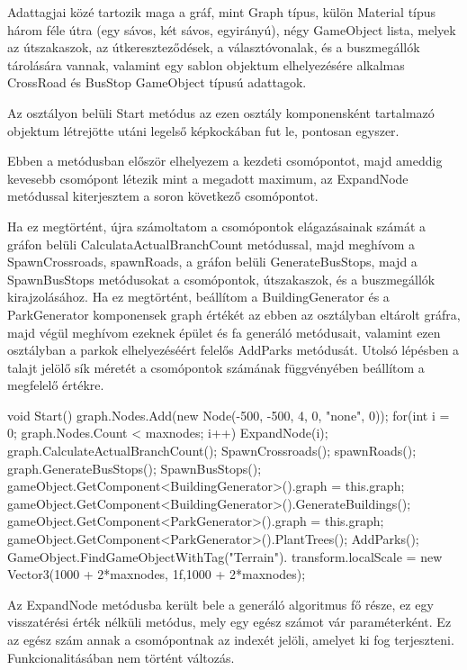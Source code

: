 Adattagjai közé tartozik maga a gráf, mint Graph típus, külön Material típus három féle útra (egy sávos, két sávos, egyirányú), négy GameObject lista, melyek az útszakaszok, az útkereszteződések, a választóvonalak, és a buszmegállók tárolására vannak, valamint egy sablon objektum elhelyezésére alkalmas CrossRoad és BusStop GameObject típusú adattagok.

Az osztályon belüli Start metódus az ezen osztály komponensként tartalmazó objektum létrejötte utáni legelső képkockában fut le, pontosan egyszer.

Ebben a metódusban először elhelyezem a kezdeti csomópontot, majd ameddig kevesebb csomópont létezik mint a megadott maximum, az ExpandNode metódussal kiterjesztem a soron következő csomópontot.

Ha ez megtörtént, újra számoltatom a csomópontok elágazásainak számát a gráfon belüli CalculataActualBranchCount metódussal, majd meghívom a SpawnCrossroads, spawnRoads, a gráfon belüli GenerateBusStops, majd a SpawnBusStops metódusokat a csomópontok, útszakaszok, és a buszmegállók kirajzolásához. Ha ez megtörtént, beállítom a BuildingGenerator és a ParkGenerator komponensek graph értékét az ebben az osztályban eltárolt gráfra, majd végül meghívom ezeknek épület és fa generáló metódusait, valamint ezen osztályban a parkok elhelyezéséért felelős AddParks metódusát. Utolsó lépésben a talajt jelölő sík méretét a csomópontok számának függvényében beállítom a megfelelő értékre.
\begin{cpp}
void Start()
    {
        graph.Nodes.Add(new Node(-500, -500, 4, 0, "none", 0));
        for(int i = 0; graph.Nodes.Count < maxnodes; i++)
        {
            ExpandNode(i);
        }
        graph.CalculateActualBranchCount();
        SpawnCrossroads();
        spawnRoads();
        graph.GenerateBusStops();
        SpawnBusStops();
        gameObject.GetComponent<BuildingGenerator>().graph = this.graph;
        gameObject.GetComponent<BuildingGenerator>().GenerateBuildings();
        gameObject.GetComponent<ParkGenerator>().graph = this.graph;
        gameObject.GetComponent<ParkGenerator>().PlantTrees();
        AddParks();
        GameObject.FindGameObjectWithTag("Terrain").
        transform.localScale = new Vector3(1000 + 2*maxnodes, 1f,1000 + 
        2*maxnodes);
    }
\end{cpp}
Az ExpandNode metódusba került bele a generáló algoritmus fő része, ez egy visszatérési érték nélküli metódus, mely egy egész számot vár paraméterként. Ez az egész szám annak a csomópontnak az indexét jelöli, amelyet ki fog terjeszteni. Funkcionalitásában nem történt változás.

